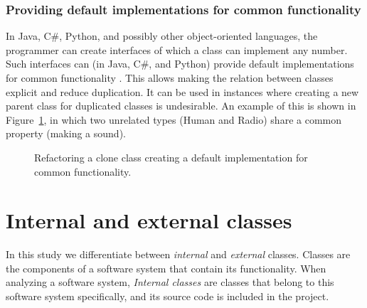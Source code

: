 \subsubsection{Providing default implementations for common functionality}
In Java, C\#, Python, and possibly other object-oriented languages, the programmer can create interfaces of which a class can implement any number. Such interfaces can (in Java, C\#, and Python) provide default implementations for common functionality \cite{mohnen2002interfaces}. This allows making the relation between classes explicit and reduce duplication. It can be used in instances where creating a new parent class for duplicated classes is undesirable. An example of this is shown in Figure~\ref{fig:createinterfaceabstraction}, in which two unrelated types (Human and Radio) share a common property (making a sound).

\begin{figure}[H]
\begin{parcolumns}{2}
\end{parcolumns}
\caption{Refactoring a clone class creating a default implementation for common functionality.}
\label{fig:createinterfaceabstraction}
\end{figure}

\section{Internal and external classes}
In this study we differentiate between \textit{internal} and \textit{external} classes. Classes are the components of a software system that contain its functionality. When analyzing a software system, \textit{Internal classes} are classes that belong to this software system specifically, and its source code is included in the project.

